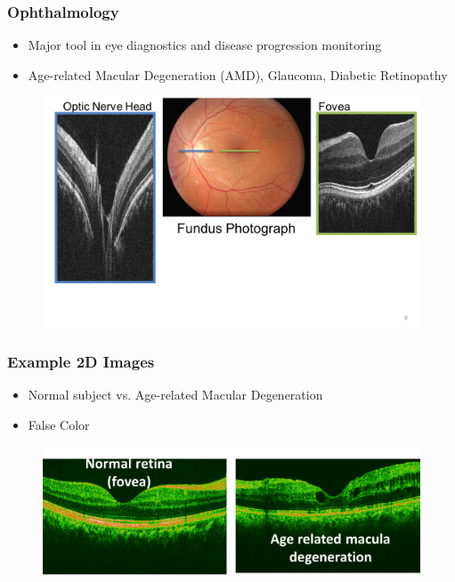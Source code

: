 \begin{frame}\frametitle{Ophthalmology}
    \begin{itemize}
        \item Major tool in eye diagnostics and disease progression monitoring
        \item Age-related Macular Degeneration (AMD), Glaucoma, Diabetic Retinopathy
    \end{itemize}
    \begin{figure}
        \includegraphics[height=0.85\textheight]{figures/FundusVsOCT.png}
    \end{figure}

\end{frame}

\begin{frame}
    \frametitle{Example 2D Images}
    \begin{itemize}
        \item Normal subject vs. Age-related Macular Degeneration
        \item False Color
    \end{itemize}
    \begin{figure}
        \includegraphics[width=\textwidth]{figures/NormalVSAMD.png}
    \end{figure}

\end{frame}


